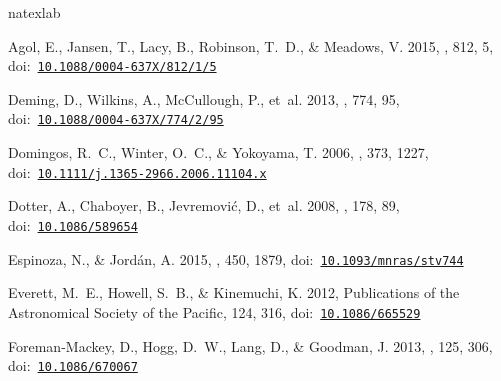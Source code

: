 \documentclass[twocolumn]{aastex62}
\begin{document}
\newcommand{\noop}[1]{}
\begin{thebibliography}{}
\expandafter\ifx\csname natexlab\endcsname\relax\def\natexlab#1{#1}\fi
\providecommand{\url}[1]{\href{#1}{#1}}
\providecommand{\dodoi}[1]{doi:~\href{http://doi.org/#1}{\nolinkurl{#1}}}
\providecommand{\doeprint}[1]{\href{http://ascl.net/#1}{\nolinkurl{http://ascl.net/#1}}}
\providecommand{\doarXiv}[1]{\href{https://arxiv.org/abs/#1}{\nolinkurl{https://arxiv.org/abs/#1}}}

{Agol}, E., {Jansen}, T., {Lacy}, B., {Robinson}, T.~D., \& {Meadows}, V. 2015,
  \apj, 812, 5, \dodoi{10.1088/0004-637X/812/1/5}

{Deming}, D., {Wilkins}, A., {McCullough}, P., {et~al.} 2013, \apj, 774, 95,
  \dodoi{10.1088/0004-637X/774/2/95}

{Domingos}, R.~C., {Winter}, O.~C., \& {Yokoyama}, T. 2006, \mnras, 373, 1227,
  \dodoi{10.1111/j.1365-2966.2006.11104.x}

{Dotter}, A., {Chaboyer}, B., {Jevremovi{\'c}}, D., {et~al.} 2008, \apjs, 178,
  89, \dodoi{10.1086/589654}

{Espinoza}, N., \& {Jord{\'a}n}, A. 2015, \mnras, 450, 1879,
  \dodoi{10.1093/mnras/stv744}

{Everett}, M.~E., {Howell}, S.~B., \& {Kinemuchi}, K. 2012, Publications of the
  Astronomical Society of the Pacific, 124, 316, \dodoi{10.1086/665529}

{Foreman-Mackey}, D., {Hogg}, D.~W., {Lang}, D., \& {Goodman}, J. 2013, \pasp,
  125, 306, \dodoi{10.1086/670067}


\end{thebibliography}
\end{document}
